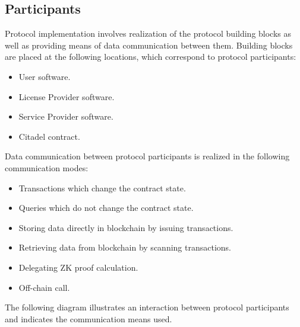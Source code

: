 
\subsection{Participants} 
Protocol implementation involves realization of the protocol building blocks as well as providing means of data communication between them. Building blocks are placed at the following locations, which correspond to protocol participants:

\begin{itemize}%
	\item User software.
	\item License Provider software.
	\item Service Provider software.
	\item Citadel contract.
\end{itemize}

\begin{flushleft}
Data communication between protocol participants is realized in the following communication modes:
\end{flushleft}

\begin{itemize}%
	\item Transactions which change the contract state.
	\item Queries which do not change the contract state.
	\item Storing data directly in blockchain by issuing transactions.
	\item Retrieving data from blockchain by scanning transactions.
	\item Delegating ZK proof calculation.
	\item Off-chain call.
\end{itemize}

\begin{flushleft}
The following diagram illustrates an interaction between protocol participants and indicates the communication means used.
\end{flushleft}

